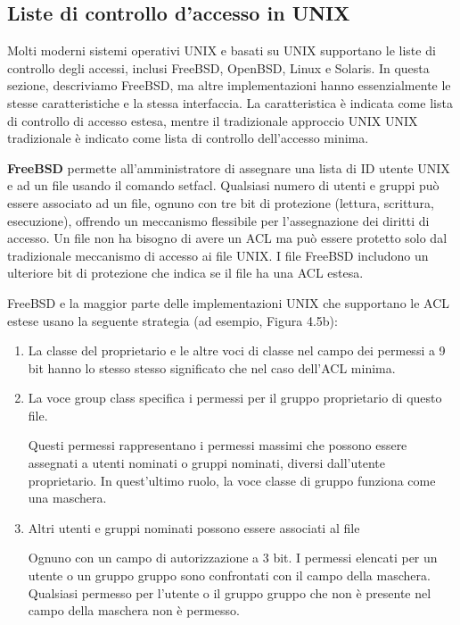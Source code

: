 \newpage
\subsection{Liste di controllo d'accesso in UNIX}
Molti moderni sistemi operativi UNIX e basati su UNIX supportano le liste di controllo degli accessi, inclusi FreeBSD, OpenBSD, Linux e Solaris. In questa sezione, descriviamo FreeBSD, ma altre implementazioni hanno essenzialmente le stesse caratteristiche e la stessa interfaccia. La caratteristica è indicata come lista di controllo di accesso estesa, mentre il tradizionale approccio UNIX UNIX tradizionale è indicato come lista di controllo dell'accesso minima.

\singlespacing

\textbf{FreeBSD} permette all'amministratore di assegnare una lista di ID utente UNIX e ad un file usando il comando setfacl. Qualsiasi numero di utenti e gruppi può essere associato ad un file, ognuno con tre bit di protezione (lettura, scrittura, esecuzione), offrendo un meccanismo flessibile per l'assegnazione dei diritti di accesso. Un file non ha bisogno di avere un ACL ma può essere protetto solo dal tradizionale meccanismo di accesso ai file UNIX. I file FreeBSD includono un ulteriore bit di protezione che indica se il file ha una ACL estesa.

FreeBSD e la maggior parte delle implementazioni UNIX che supportano le ACL estese usano la seguente strategia (ad esempio, Figura 4.5b):
\begin{enumerate}
    \item La classe del proprietario e le altre voci di classe nel campo dei permessi a 9 bit hanno lo stesso stesso significato che nel caso dell'ACL minima.
    
    \item La voce group class specifica i permessi per il gruppo proprietario di questo file.


Questi permessi rappresentano i permessi massimi che possono essere assegnati a utenti nominati o gruppi nominati, diversi dall'utente proprietario. In quest'ultimo ruolo, la voce classe di gruppo funziona come una maschera.

    \item Altri utenti e gruppi nominati possono essere associati al file
    
Ognuno con un campo di autorizzazione a 3 bit. I permessi elencati per un utente o un gruppo gruppo sono confrontati con il campo della maschera. Qualsiasi permesso per l'utente o il gruppo gruppo che non è presente nel campo della maschera non è permesso.
\end{enumerate}

